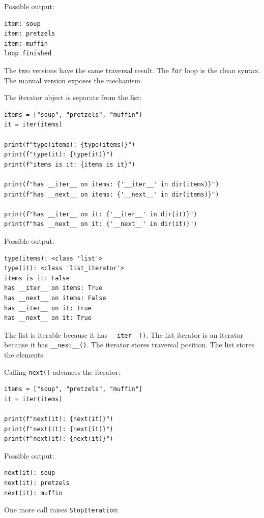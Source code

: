 Possible output:

\begin{verbatim}
item: soup
item: pretzels
item: muffin
loop finished
\end{verbatim}

The two versions have the same traversal result. The \texttt{for} loop is the clean syntax. The manual version exposes the mechanism.

The iterator object is separate from the list:

\begin{verbatim}
items = ["soup", "pretzels", "muffin"]
it = iter(items)

print(f"type(items): {type(items)}")
print(f"type(it): {type(it)}")
print(f"items is it: {items is it}")

print(f"has __iter__ on items: {'__iter__' in dir(items)}")
print(f"has __next__ on items: {'__next__' in dir(items)}")

print(f"has __iter__ on it: {'__iter__' in dir(it)}")
print(f"has __next__ on it: {'__next__' in dir(it)}")
\end{verbatim}

Possible output:

\begin{verbatim}
type(items): <class 'list'>
type(it): <class 'list_iterator'>
items is it: False
has __iter__ on items: True
has __next__ on items: False
has __iter__ on it: True
has __next__ on it: True
\end{verbatim}

The list is iterable because it has \texttt{\_\_iter\_\_()}. The list iterator is an iterator because it has \texttt{\_\_next\_\_()}. The iterator stores traversal position. The list stores the elements.

Calling \texttt{next()} advances the iterator:

\begin{verbatim}
items = ["soup", "pretzels", "muffin"]
it = iter(items)

print(f"next(it): {next(it)}")
print(f"next(it): {next(it)}")
print(f"next(it): {next(it)}")
\end{verbatim}

Possible output:

\begin{verbatim}
next(it): soup
next(it): pretzels
next(it): muffin
\end{verbatim}

One more call raises \texttt{StopIteration}:

